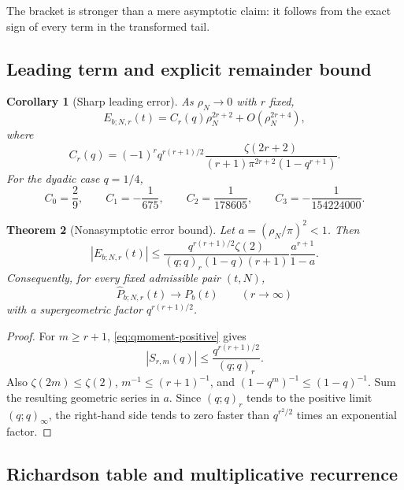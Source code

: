 \documentclass[11pt]{article}
\newtheorem{theorem}{Theorem}[section]
\newtheorem{corollary}[theorem]{Corollary}
\theoremstyle{definition}
\theoremstyle{remark}
\begin{document}
The bracket is stronger than a mere asymptotic claim: it follows from the exact sign of every term in the transformed tail.

\subsection{Leading term and explicit remainder bound}

\begin{corollary}[Sharp leading error]
\label{cor:leading-error}
As $\rho_N\to0$ with $r$ fixed,
\begin{equation}
E_{b;N,r}(t)
=C_r(q)\rho_N^{2r+2}+O(\rho_N^{2r+4}),
\label{eq:leading-error}
\end{equation}
where
\begin{equation}
C_r(q)=(-1)^r q^{r(r+1)/2}
\frac{\zeta(2r+2)}{(r+1)\pi^{2r+2}(1-q^{r+1})}.
\label{eq:Cr}
\end{equation}
For the dyadic case $q=1/4$,
\begin{equation}
C_0=\frac29,\qquad
C_1=-\frac1{675},\qquad
C_2=\frac1{178605},\qquad
C_3=-\frac1{154224000}.
\label{eq:Cr-dyadic}
\end{equation}
\end{corollary}

\begin{theorem}[Nonasymptotic error bound]
\label{thm:error-bound}
Let $a=(\rho_N/\pi)^2<1$. Then
\begin{equation}
|E_{b;N,r}(t)|
\le
\frac{q^{r(r+1)/2}\zeta(2)}
{(q;q)_r(1-q)(r+1)}
\frac{a^{r+1}}{1-a}.
\label{eq:error-bound}
\end{equation}
Consequently, for every fixed admissible pair $(t,N)$,
\begin{equation}
\widehat P_{b;N,r}(t)\longrightarrow P_b(t)
\qquad(r\to\infty)
\label{eq:r-convergence}
\end{equation}
with a supergeometric factor $q^{r(r+1)/2}$.
\end{theorem}

\begin{proof}
For $m\ge r+1$, \cref{eq:qmoment-positive} gives
\[
|S_{r,m}(q)|\le\frac{q^{r(r+1)/2}}{(q;q)_r}.
\]
Also $\zeta(2m)\le\zeta(2)$, $m^{-1}\le(r+1)^{-1}$, and $(1-q^m)^{-1}\le(1-q)^{-1}$. Sum the resulting geometric series in $a$. Since $(q;q)_r$ tends to the positive limit $(q;q)_\infty$, the right-hand side tends to zero faster than $q^{r^2/2}$ times an exponential factor.
\end{proof}

\subsection{Richardson table and multiplicative recurrence}
\end{document}
